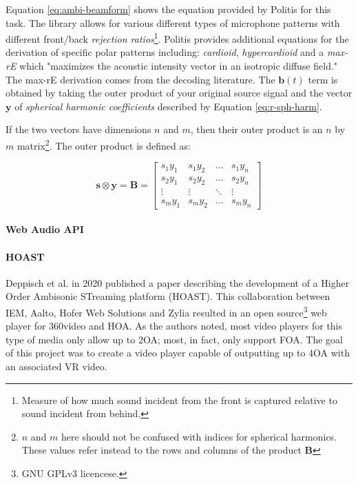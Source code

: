
Equation \ref{eq:ambi-beamform} shows the equation provided by Politis \cite{politis2016jsambisonics} for this task. The library allows for various different types of microphone patterns with different front/back \textit{rejection ratios}\footnote{Measure of how much sound incident from the front is captured relative to sound incident from behind.}. Politis \cite{politis2016jsambisonics} provides additional equations for the derivation of specific polar patterns including: \textit{cardioid}, \textit{hypercardioid} and a \textit{max-rE} which "maximizes the acoustic intensity vector in an isotropic diffuse field." The max-rE derivation comes from the decoding literature. The $\mathbf{b}(t)$ term is obtained by taking the outer product of your original source signal and the vector $\mathbf{y}$ of \textit{spherical harmonic coefficients} described by Equation \ref{eq:r-sph-harm}.

If the two vectors have dimensions $n$ and $m$, then their outer product is an $n$ by $m$ matrix\footnote{$n$ and $m$ here should not be confused with indices for spherical harmonics. These values refer instead to the rows and columns of the product $\mathbf{B}$}. The outer product is defined as: 

\begin{equation}
\mathbf{s} \otimes \mathbf{y}=\mathbf{B}=\left[\begin{array}{cccc}
s_{1} y_{1} & s_{1} y_{2} & \ldots & s_{1} y_{n} \\
s_{2} y_{1} & s_{2} y_{2} & \ldots & s_{2} y_{n} \\
\vdots & \vdots & \ddots & \vdots \\
s_{m} y_{1} & s_{m} y_{2} & \ldots & s_{m} y_{n}
\end{array}\right]
\end{equation}

\paragraph{Web Audio API}

\paragraph{HOAST}

Deppisch et al. \cite{deppisch2020hoast} in 2020 published a paper describing the development of a Higher Order Ambisonic STreaming platform (HOAST). This collaboration between IEM, Aalto, Hofer Web Solutions and Zylia resulted in an open source\footnote{GNU GPLv3 licencese.} web player for 360\textdegree  video and HOA. As the authors noted, most video players for this type of media only allow up to 2OA; most, in fact, only support FOA. The goal of this project was to create a video player capable of outputting up to 4OA with an associated VR video. 


